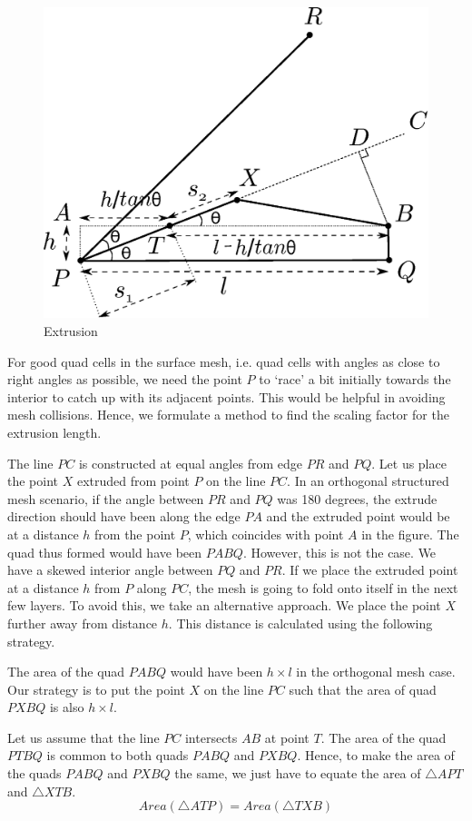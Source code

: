 \documentclass[conf]{new-aiaa}
\begin{document}
\begin{figure}[hbt!]
    \centering
    \includegraphics[width=.5\linewidth]{extrusionScaling/extrusionScaling.eps}
    \caption{Extrusion }
    \label{fig:basic-diagram-extrusion-factor}
\end{figure}

For good quad cells in the surface mesh, i.e. quad cells with angles as close to right angles as possible, we need the point $P$ to `race' a bit initially towards the interior to catch up with its adjacent points. This would be helpful in avoiding mesh collisions. Hence, we formulate a method to find the scaling factor for the extrusion length.

The line $PC$ is constructed at equal angles from edge $PR$ and $PQ$. Let us place the point $X$ extruded from point $P$ on the line $PC$. In an orthogonal structured mesh scenario, if the angle between $PR$ and $PQ$ was 180 degrees, the extrude direction should have been along the edge $PA$ and the extruded point would be at a distance $h$ from the point $P$, which coincides with point $A$ in the figure. The quad thus formed would have been $PABQ$. However, this is not the case. We have a skewed interior angle between $PQ$ and $PR$. If we place the extruded point at a distance $h$ from $P$ along $PC$, the mesh is going to fold onto itself in the next few layers. To avoid this, we take an alternative approach. We place the point $X$ further away from distance $h$. This distance is calculated using the following strategy.

The area of the quad $PABQ$ would have been $h\times l$ in the orthogonal mesh case. Our strategy is to put the point $X$ on the line $PC$ such that the area of quad $PXBQ$ is also $h\times l$.

Let us assume that the line $PC$ intersects $AB$ at point $T$. The area of the quad $PTBQ$ is common to both quads $PABQ$ and $PXBQ$. Hence, to make the area of the quads $PABQ$ and $PXBQ$ the same, we just have to equate the area of $\bigtriangleup APT$ and $\bigtriangleup XTB$.
\begin{equation}
    Area(\bigtriangleup ATP) = Area(\bigtriangleup TXB)
    \label{eqn:area-constraint}
\end{equation}
\end{document}
